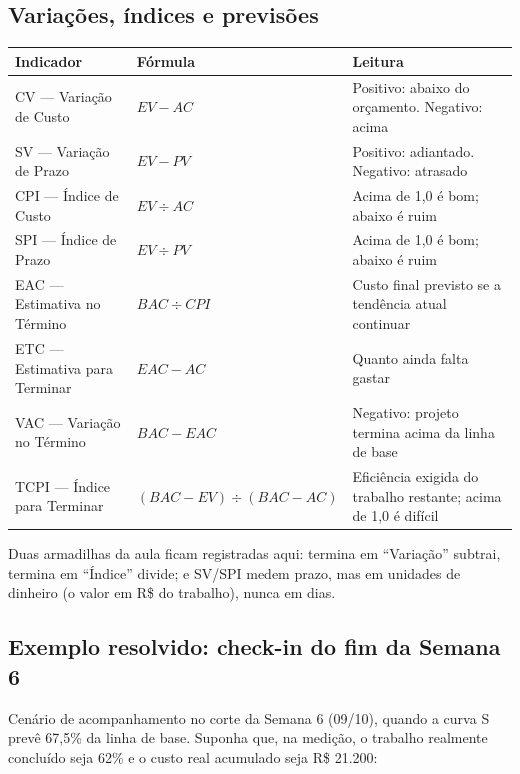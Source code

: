 \documentclass[11pt,a4paper]{article}
\begin{document}
\subsection{Variações, índices e previsões}\label{fin:formulas}
\begin{center}
\begin{tabularx}{\textwidth}{L L L}
\toprule
\textbf{Indicador} & \textbf{Fórmula} & \textbf{Leitura} \\
\midrule
CV --- Variação de Custo & $EV - AC$ & Positivo: abaixo do orçamento. Negativo: acima \\
SV --- Variação de Prazo & $EV - PV$ & Positivo: adiantado. Negativo: atrasado \\
CPI --- Índice de Custo & $EV \div AC$ & Acima de 1,0 é bom; abaixo é ruim \\
SPI --- Índice de Prazo & $EV \div PV$ & Acima de 1,0 é bom; abaixo é ruim \\
EAC --- Estimativa no Término & $BAC \div CPI$ & Custo final previsto se a tendência atual continuar \\
ETC --- Estimativa para Terminar & $EAC - AC$ & Quanto ainda falta gastar \\
VAC --- Variação no Término & $BAC - EAC$ & Negativo: projeto termina acima da linha de base \\
TCPI --- Índice para Terminar & $(BAC - EV) \div (BAC - AC)$ & Eficiência exigida do trabalho restante; acima de 1,0 é difícil \\
\bottomrule
\end{tabularx}
\end{center}

\noindent Duas armadilhas da aula ficam registradas aqui: termina em ``Variação'' subtrai, termina em ``Índice'' divide; e SV/SPI medem prazo, mas em unidades de dinheiro (o valor em R\$ do trabalho), nunca em dias.

\subsection{Exemplo resolvido: check-in do fim da Semana 6}\label{fin:exemplo}
Cenário de acompanhamento no corte da Semana 6 (09/10), quando a curva S prevê 67,5\% da linha de base. Suponha que, na medição, o trabalho realmente concluído seja 62\% e o custo real acumulado seja R\$ 21.200:
\end{document}
